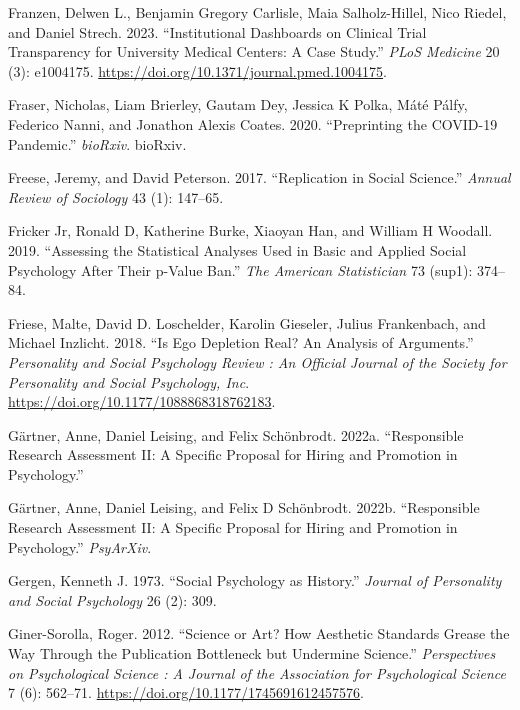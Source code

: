 \documentclass[
  letterpaper,
  DIV=11,
  numbers=noendperiod]{scrreprt}
\newlength{\cslhangindent}
\newenvironment{CSLReferences}[2] %
 {\begin{list}{}{%
  \setlength{\itemindent}{0pt}
  \setlength{\leftmargin}{0pt}
  \setlength{\parsep}{0pt}
  \ifodd #1
   \setlength{\leftmargin}{\cslhangindent}
   \setlength{\itemindent}{-1\cslhangindent}
  \fi
  \setlength{\itemsep}{#2\baselineskip}}}
 {\end{list}}
\begin{document}
\begin{CSLReferences}{1}{0}
Franzen, Delwen L., Benjamin Gregory Carlisle, Maia Salholz-Hillel, Nico
Riedel, and Daniel Strech. 2023. {``Institutional Dashboards on Clinical
Trial Transparency for University Medical Centers: A Case Study.''}
\emph{PLoS Medicine} 20 (3): e1004175.
\url{https://doi.org/10.1371/journal.pmed.1004175}.

Fraser, Nicholas, Liam Brierley, Gautam Dey, Jessica K Polka, Máté
Pálfy, Federico Nanni, and Jonathon Alexis Coates. 2020. {``Preprinting
the {COVID-19} Pandemic.''} \emph{bioRxiv}. bioRxiv.

Freese, Jeremy, and David Peterson. 2017. {``Replication in Social
Science.''} \emph{Annual Review of Sociology} 43 (1): 147--65.

Fricker Jr, Ronald D, Katherine Burke, Xiaoyan Han, and William H
Woodall. 2019. {``Assessing the Statistical Analyses Used in Basic and
Applied Social Psychology After Their p-Value Ban.''} \emph{The American
Statistician} 73 (sup1): 374--84.

Friese, Malte, David D. Loschelder, Karolin Gieseler, Julius
Frankenbach, and Michael Inzlicht. 2018. {``Is Ego Depletion Real? An
Analysis of Arguments.''} \emph{Personality and Social Psychology Review
: An Official Journal of the Society for Personality and Social
Psychology, Inc}. \url{https://doi.org/10.1177/1088868318762183}.

Gärtner, Anne, Daniel Leising, and Felix Schönbrodt. 2022a.
{``Responsible Research Assessment II: A Specific Proposal for Hiring
and Promotion in Psychology.''}

Gärtner, Anne, Daniel Leising, and Felix D Schönbrodt. 2022b.
{``Responsible Research Assessment {II}: A Specific Proposal for Hiring
and Promotion in Psychology.''} \emph{PsyArXiv}.

Gergen, Kenneth J. 1973. {``Social Psychology as History.''}
\emph{Journal of Personality and Social Psychology} 26 (2): 309.

Giner-Sorolla, Roger. 2012. {``Science or Art? How Aesthetic Standards
Grease the Way Through the Publication Bottleneck but Undermine
Science.''} \emph{Perspectives on Psychological Science : A Journal of
the Association for Psychological Science} 7 (6): 562--71.
\url{https://doi.org/10.1177/1745691612457576}.


\end{CSLReferences}
\end{document}
